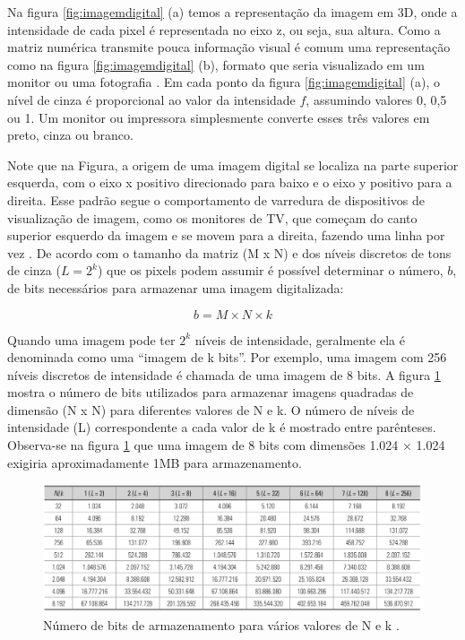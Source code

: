\documentclass[
  brazilian,
]{book}
\begin{document}
Na figura \ref{fig:imagemdigital} (a) temos a representação da imagem em 3D, onde a intensidade de cada pixel é representada no eixo z, ou seja, sua altura. Como a matriz numérica transmite pouca informação visual é comum uma representação como na figura \ref{fig:imagemdigital} (b), formato que seria visualizado em um monitor ou uma fotografia \autocite{gonzalez2010}. Em cada ponto da figura \ref{fig:imagemdigital} (a), o nível de cinza é proporcional ao valor da intensidade \(f\), assumindo valores 0, 0,5 ou 1. Um monitor ou impressora simplesmente converte esses três valores em preto, cinza ou branco.

Note que na Figura, a origem de uma imagem digital se localiza na parte superior esquerda, com o eixo x positivo direcionado para baixo e o eixo y positivo para a direita. Esse padrão segue o comportamento de varredura de dispositivos de visualização de imagem, como os monitores de TV, que começam do canto superior esquerdo da imagem e se movem para a direita, fazendo uma linha por vez \autocite{gonzalez2010}.
De acordo com o tamanho da matriz (M x N) e dos níveis discretos de tons de cinza (\(L = 2^k\)) que os pixels podem assumir é possível determinar o número, \(b\), de bits necessários para armazenar uma imagem digitalizada:

\[b = M × N × k\]

Quando uma imagem pode ter \(2^k\) níveis de intensidade, geralmente ela é denominada como uma ``imagem de k bits''. Por exemplo, uma imagem com 256 níveis discretos de intensidade é chamada de uma imagem de 8 bits. A figura \ref{fig:tabelabits} mostra o número de bits utilizados para armazenar imagens quadradas de dimensão (N x N) para diferentes valores de N e k. O número de níveis de intensidade (L) correspondente a cada valor de k é mostrado entre parênteses. Observa-se na figura \ref{fig:tabelabits} que uma imagem de 8 bits com dimensões 1.024 × 1.024 exigiria aproximadamente 1MB para armazenamento.



\begin{figure}

{\centering \includegraphics[width=1\linewidth]{imagens/02-formacao/tabelabits} 

}

\caption{Número de bits de armazenamento para vários valores de N e k \autocite[p.38]{gonzalez2010}.}\label{fig:tabelabits}
\end{figure}
\end{document}
